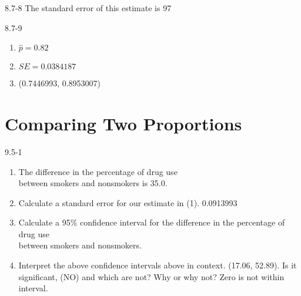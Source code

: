 \begin{exsol@solution}{8.7-8}
The standard error of this estimate is 97

\end{exsol@solution}
\begin{exsol@solution}{8.7-9}
\begin{enumerate}
\item $\hat{p} = 0.82$
\item $SE = 0.0384187$
\item (0.7446993, 0.8953007)
\end{enumerate}

\end{exsol@solution}
\setcounter{chapter}{8}\chapter{Comparing Two Proportions }
\begin{exsol@solution}{9.5-1}


\begin{enumerate}
\item The difference in the percentage of drug use \\ between smokers and nonsmokers is 35.0.
\item Calculate a standard error for our estimate in (1).  0.0913993
\item Calculate a 95\% confidence interval for the difference in the percentage of drug use \\ between smokers and nonsmokers.
\item Interpret the above confidence intervals above in context.  (17.06, 52.89). Is it significant, (NO) and which are not? Why or why not? Zero is not within interval.
\end{enumerate}

\end{exsol@solution}
